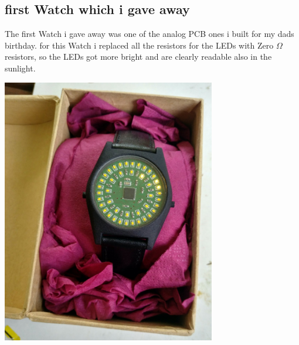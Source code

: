 \subsection{first Watch which i gave away}
The first Watch i gave away was one of the analog PCB ones i built for my dads birthday.
for this Watch i replaced all the resistors for the LEDs with Zero $\Omega$ resistors, so the LEDs got more bright and are clearly readable also in the sunlight.
\begin{center}
  \includegraphics[width=0.7\textwidth]{../Pictures/AnalogWatch1.jpg}
\end{center}